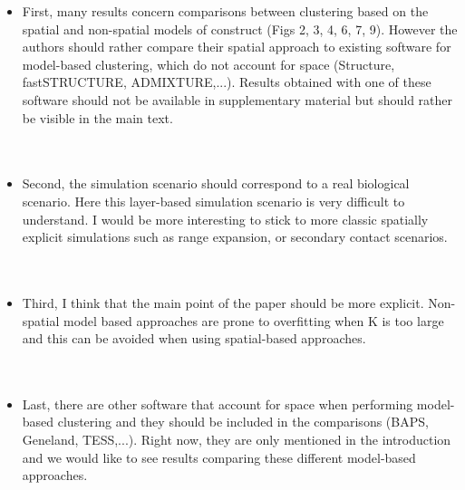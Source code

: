 \documentclass[11pt]{letter}
\newcommand{\gb}[1]{{\bf\color{black}{#1}}}
\begin{document}
\begin{itemize}
\item First, many results concern comparisons between clustering based on the spatial and non-spatial models of construct (Figs 2, 3, 4, 6, 7, 9). However the authors should rather compare their spatial approach to existing software for model-based clustering, which do not account for space (Structure, fastSTRUCTURE, ADMIXTURE,...). Results obtained with one of these software should not be available in supplementary material but should rather be visible in the main text.\\\\
\gb{double axis bringing in marginal likelihood of fastSTRUCTURE for Fig 3, or throw in suppmat}\\

\item Second, the simulation scenario should correspond to a real biological scenario. Here this layer-based simulation scenario is very difficult to understand. I would be more interesting to stick to more classic spatially explicit simulations such as range expansion, or secondary contact scenarios.\\\\
\gb{trade off w/ space w/ empirical applications, moving the adprop fit figs into the main text}\\

\item Third, I think that the main point of the paper should be more explicit. Non-spatial model based approaches are prone to overfitting when K is too large and this can be avoided when using spatial-based approaches. \\\\
\gb{}\\

\item Last, there are other software that account for space when performing model-based clustering and they should be included in the comparisons (BAPS, Geneland, TESS,...). Right now, they are only mentioned in the introduction and we would like to see results comparing these different model-based approaches.\\\\
\gb{
The methods mentioned here --- BAPS, Geneland, and TESS --- 
place spatial priors on admixture proportions
and/or cluster membership, 
but like STRUCTURE, they assume that allele frequencies 
within a cluster are constant across space.
Therefore, although spatially explicit, this parameterization does not 
account for space in a way that avoids the problem we describe in our manuscript: 
the characterization of spatially continuous differentiation 
as clines of admixture across spurious clusters.
STRUCTURE is the canonical model-based clustering algorithm
(having been cited $>$ 20,000 times), but is too slow to be run 
on the modern-scale SNP datasets we simulate, 
so fastSTRUCTURE, which implements an extremely similar model 
within a faster inference framework, 
provides the best comparison to our method.}\\


\end{itemize}
\end{document}
